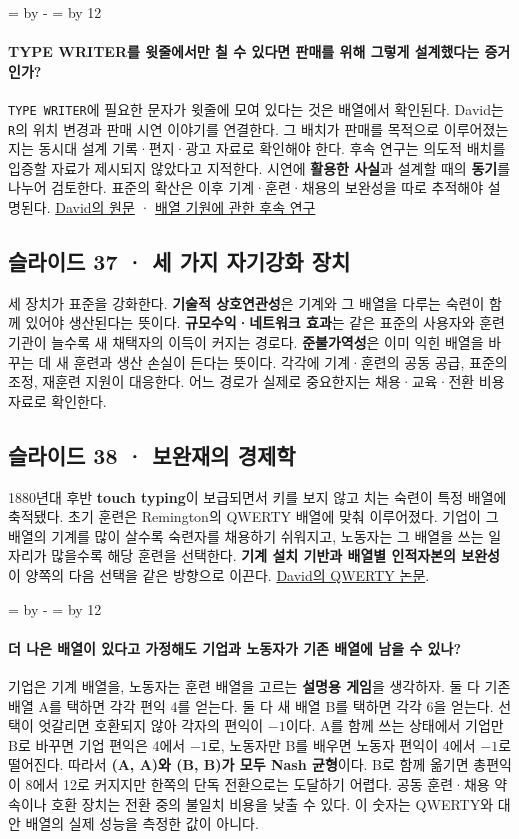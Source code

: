 \documentclass[10pt,a4paper]{article}
\newcommand{\ReserveQuestionSpace}{%
  \par\begingroup
  \dimen0=\pagegoal \advance\dimen0 by -\pagetotal
  \dimen2=\baselineskip \multiply\dimen2 by 12
  \ifdim\dimen0<\dimen2 \newpage\fi
  \endgroup}
\begin{document}
\ReserveQuestionSpace
\paragraph{TYPE WRITER를 윗줄에서만 칠 수 있다면 판매를 위해 그렇게 설계했다는 증거인가?}
\texttt{TYPE WRITER}에 필요한 문자가 윗줄에 모여 있다는 것은 배열에서 확인된다. David는 \texttt{R}의 위치 변경과 판매 시연 이야기를 연결한다. 그 배치가 판매를 목적으로 이루어졌는지는 동시대 설계 기록·편지·광고 자료로 확인해야 한다. 후속 연구는 의도적 배치를 입증할 자료가 제시되지 않았다고 지적한다. 시연에 \textbf{활용한 사실}과 설계할 때의 \textbf{동기}를 나누어 검토한다. 표준의 확산은 이후 기계·훈련·채용의 보완성을 따로 추적해야 설명된다. \href{https://www.jstor.org/stable/1805621}{David의 원문} · \href{https://strathprints.strath.ac.uk/67983/}{배열 기원에 관한 후속 연구}\par

\subsection{슬라이드 37 · 세 가지 자기강화 장치}
세 장치가 표준을 강화한다. \textbf{기술적 상호연관성}은 기계와 그 배열을 다루는 숙련이 함께 있어야 생산된다는 뜻이다. \textbf{규모수익·네트워크 효과}는 같은 표준의 사용자와 훈련기관이 늘수록 새 채택자의 이득이 커지는 경로다. \textbf{준불가역성}은 이미 익힌 배열을 바꾸는 데 새 훈련과 생산 손실이 든다는 뜻이다. 각각에 기계·훈련의 공동 공급, 표준의 조정, 재훈련 지원이 대응한다. 어느 경로가 실제로 중요한지는 채용·교육·전환 비용 자료로 확인한다.\par

\subsection{슬라이드 38 · 보완재의 경제학}
1880년대 후반 \textbf{touch typing}이 보급되면서 키를 보지 않고 치는 숙련이 특정 배열에 축적됐다. 초기 훈련은 Remington의 QWERTY 배열에 맞춰 이루어졌다. 기업이 그 배열의 기계를 많이 살수록 숙련자를 채용하기 쉬워지고, 노동자는 그 배열을 쓰는 일자리가 많을수록 해당 훈련을 선택한다. \textbf{기계 설치 기반과 배열별 인적자본의 보완성}이 양쪽의 다음 선택을 같은 방향으로 이끈다. \href{https://www.jstor.org/stable/1805621}{David의 QWERTY 논문}.\par

\ReserveQuestionSpace
\paragraph{더 나은 배열이 있다고 가정해도 기업과 노동자가 기존 배열에 남을 수 있나?}
기업은 기계 배열을, 노동자는 훈련 배열을 고르는 \textbf{설명용 게임}을 생각하자. 둘 다 기존 배열 A를 택하면 각각 편익 4를 얻는다. 둘 다 새 배열 B를 택하면 각각 6을 얻는다. 선택이 엇갈리면 호환되지 않아 각자의 편익이 $-1$이다. A를 함께 쓰는 상태에서 기업만 B로 바꾸면 기업 편익은 4에서 $-1$로, 노동자만 B를 배우면 노동자 편익이 4에서 $-1$로 떨어진다. 따라서 \textbf{(A, A)와 (B, B)가 모두 Nash 균형}이다. B로 함께 옮기면 총편익이 8에서 12로 커지지만 한쪽의 단독 전환으로는 도달하기 어렵다. 공동 훈련·채용 약속이나 호환 장치는 전환 중의 불일치 비용을 낮출 수 있다. 이 숫자는 QWERTY와 대안 배열의 실제 성능을 측정한 값이 아니다.\par
\end{document}
